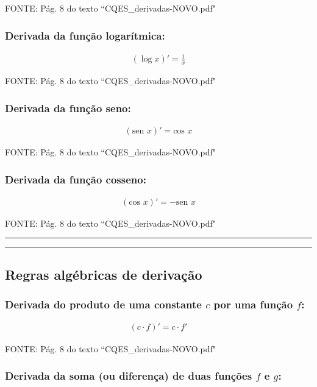 \documentclass[portuguese,a4paper,12pt,onecolumn,fleqn]{article}
\newcommand{\myline}{\par
  \kern3pt %
  \hrule height 1.5pt
  \kern2pt %
  \hrule height 0.8pt
  \kern3pt %
}
\begin{document}
FONTE: Pág. 8 do texto ``CQES\_derivadas-NOVO.pdf"


\subsubsection*{Derivada da função logarítmica:}

\begin{gather*}
(\log x)' = \frac{1}{x}
\end{gather*}

FONTE: Pág. 8 do texto ``CQES\_derivadas-NOVO.pdf"


\subsubsection*{Derivada da função seno:}

\begin{gather*}
(\textrm{sen } x)' = \textrm{cos } x
\end{gather*}

FONTE: Pág. 8 do texto ``CQES\_derivadas-NOVO.pdf"


\subsubsection*{Derivada da função cosseno:}

\begin{gather*}
(\textrm{cos } x)' = - \textrm{sen } x
\end{gather*}

FONTE: Pág. 8 do texto ``CQES\_derivadas-NOVO.pdf"


\myline	%


\subsection*{Regras algébricas de derivação}

\subsubsection*{Derivada do produto de uma constante $c$ por uma função $f$:}

\begin{gather*}
(c \cdot f)' = c \cdot f'
\end{gather*}

FONTE: Pág. 8 do texto ``CQES\_derivadas-NOVO.pdf"


\subsubsection*{Derivada da soma (ou diferença) de duas funções $f$ e $g$:}
\end{document}
